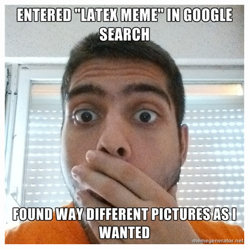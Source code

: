\documentclass{article}
\begin{document}
\begin{landscape}
\begin{figure}[h]
{    \vspace{1em}
    
    
    
    
    \begin{subfloatrow*}[3]    
        \ffigbox
        {
         \label{subfig1}
        }
        {\includegraphics[width=\linewidth]{./img/67972605}}
        

\end{subfloatrow*}}
\end{figure}
\end{landscape}
\end{document}
